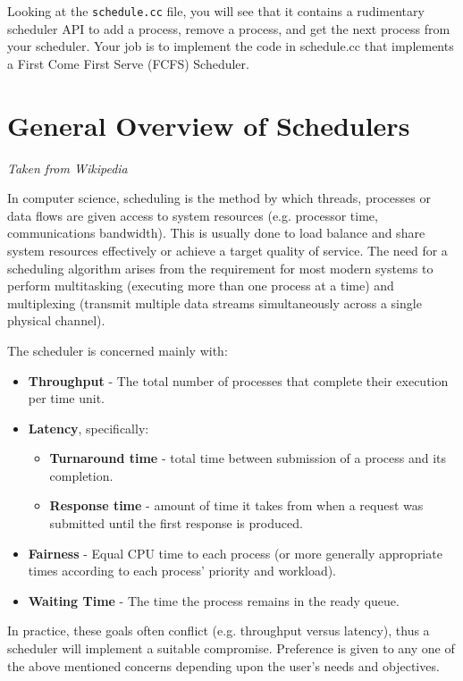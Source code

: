 \documentclass[11pt]{article}
\begin{document}
Looking at the {\tt schedule.cc} file, you will see that it contains a rudimentary scheduler API to add a process, remove a process, and get the next process from your scheduler. Your job is to implement the code in schedule.cc that implements a First Come First Serve (FCFS) Scheduler. 

\section*{General Overview of Schedulers}
\emph{Taken from Wikipedia\cite{schedules}}

In computer science, scheduling is the method by which threads, processes or data flows are given access to system resources (e.g. processor time, communications bandwidth). This is usually done to load balance and share system resources effectively or achieve a target quality of service. The need for a scheduling algorithm arises from the requirement for most modern systems to perform multitasking (executing more than one process at a time) and multiplexing (transmit multiple data streams simultaneously across a single physical channel).

The scheduler is concerned mainly with:

\begin{itemize}
\item \textbf{Throughput} - The total number of processes that complete their execution per time unit.
\item \textbf{Latency}, specifically:
\begin{itemize}
        \item \textbf{Turnaround time} - total time between submission of a process and its completion.
        \item \textbf{Response time} - amount of time it takes from when a request was submitted until the first response is produced.
\end{itemize}
\item \textbf{Fairness} - Equal CPU time to each process (or more generally appropriate times according to each process' priority and workload).
\item \textbf{Waiting Time} - The time the process remains in the ready queue.
\end{itemize}

In practice, these goals often conflict (e.g. throughput versus latency), thus a scheduler will implement a suitable compromise. Preference is given to any one of the above mentioned concerns depending upon the user's needs and objectives.
\end{document}
